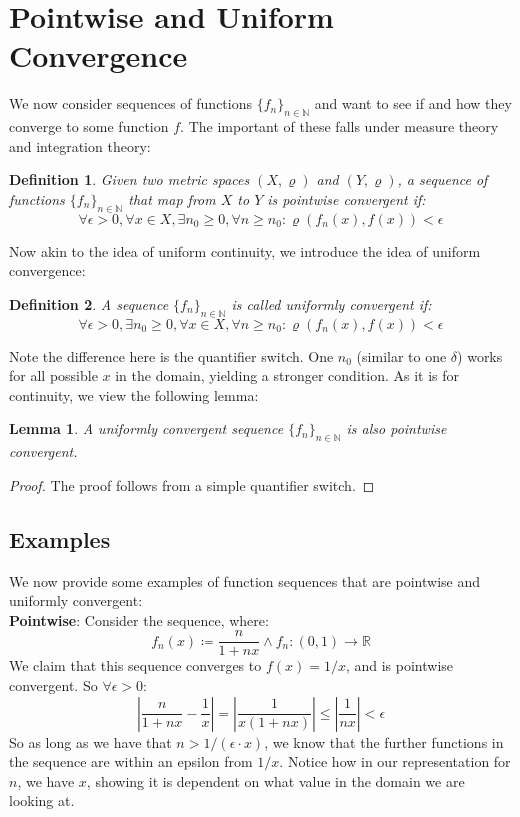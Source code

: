 \documentclass[10pt,letterpaper]{article} %
\newtheorem{lem}{Lemma}[section]
\newtheorem{defn}{Definition}[section]
\begin{document}
\section{Pointwise and Uniform Convergence}
We now consider sequences of functions $\{f_n\}_{n \in \mathbb{N}}$ and want to see if and how they converge to some function $f$. The important of these falls under measure theory and integration theory:
\begin{defn}
Given two metric spaces $(X, \varrho)$ and $(Y, \varrho)$, a sequence of functions $\{f_n\}_{n \in \mathbb{N}}$ that map from $X$ to $Y$ is pointwise convergent if:
\begin{equation*}
\forall \epsilon > 0, \forall x \in X, \exists n_0 \geqslant 0, \forall n \geqslant n_0: \varrho(f_n(x), f(x)) < \epsilon
\end{equation*}
\end{defn}
Now akin to the idea of uniform continuity, we introduce the idea of uniform convergence:
\begin{defn}
A sequence $\{f_n\}_{n \in \mathbb{N}}$ is called uniformly convergent if:
\begin{equation*}
\forall \epsilon > 0, \exists n_0 \geqslant 0, \forall x \in X, \forall n \geqslant n_0: \varrho(f_n(x), f(x)) < \epsilon
\end{equation*}
\end{defn}
Note the difference here is the quantifier switch. One $n_0$ (similar to one $\delta$) works for all possible $x$ in the domain, yielding a stronger condition. As it is for continuity, we view the following lemma:
\begin{lem}
A uniformly convergent sequence $\{f_n\}_{n \in \mathbb{N}}$ is also pointwise convergent.
\end{lem}
\begin{proof}
The proof follows from a simple quantifier switch.
\end{proof}

\medskip
\subsection{Examples}
We now provide some examples of function sequences that are pointwise and uniformly convergent:\\

\textbf{Pointwise}: Consider the sequence, where:
\begin{equation*}
  f_n(x) \coloneq \frac{n}{1+nx} \land f_n: (0, 1) \xrightarrow{} \mathbb{R}
\end{equation*}
We claim that this sequence converges to $f(x) = 1/x$, and is pointwise convergent. So $\forall \epsilon > 0$:
\begin{equation*}
\left|\frac{n}{1+nx} - \frac{1}{x}\right| = \left|\frac{1}{x(1+nx)}\right| \leqslant \left|\frac{1}{nx}\right| < \epsilon
\end{equation*}
So as long as we have that $n > 1/(\epsilon \cdot x)$, we know that the further functions in the sequence are within an epsilon from $1/x$. Notice how in our representation for $n$, we have $x$, showing it is dependent on what value in the domain we are looking at.\\
\end{document}
